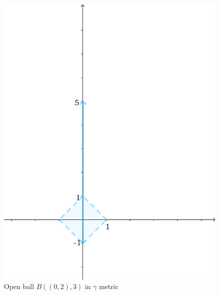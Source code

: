 \documentclass[12pt]{article}
\begin{document}
	
	\begin{figure}
		\centering
		\includegraphics[scale=0.20] {graph8}
		\caption{\label{fig:8} Open ball $B((0,2), 3) $ in $\gamma$ metric }
	\end{figure}
	
\end{document}
